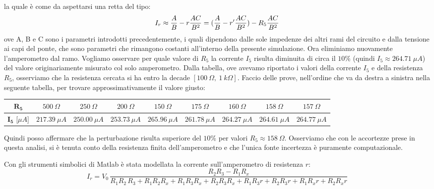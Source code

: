 la quale è come da aspettarsi una retta del tipo:
\begin{equation}
    I_r \approx {A\over{B}} - r {{A C}\over{B^2}} = ({A\over{B}} - r' {{A C}\over{B^2}}) - R_5 {{A C}\over{B^2}}  
\end{equation}
ove A, B e C sono i parametri introdotti precedentemente, i quali dipendono dalle sole impedenze dei altri rami del circuito e dalla tensione ai capi del ponte, che sono parametri che rimangono costanti all'interno della presente simulazione.
Ora eliminiamo nuovamente l'amperometro dal ramo. Vogliamo osservare per quale valore di $R_5$ la corrente $I_5$ risulta diminuita di circa il $10 \%$ (quindi $I_5 \approx 264.71 \: \mu A$) del valore originariamente misurato col solo amperometro. Dalla tabella, ove avevamo riportato i valori della corrente $I_5$ e della resistenza $R_5$, osserviamo che la resistenza cercata si ha entro la decade $[100 \: \Omega, \: 1 \: k\Omega]$.
Faccio delle prove, nell'ordine che va da destra a sinistra nella seguente tabella, per trovare approssimativamente il valore giusto:
\begin{center}
\begin{tabular}{|c|c|c|c|c|c|c|c|c|}
\hline
$\textbf{R}_{\textbf{5}}$        &$500 \: \Omega$        &$250 \: \Omega$        &$200 \: \Omega$        &$150 \: \Omega$        &$175 \: \Omega$        &$160 \: \Omega$        &$158 \: \Omega$        &$157 \: \Omega$        \\
\hline
$\textbf{I}_{\textbf{5}}$ [$\mu A$]         &$217.39 \: \mu A$        &$250.00 \: \mu A$        &$253.73 \: \mu A$        &$265.96 \: \mu A$        &$261.78 \: \mu A$        &$264.27 \: \mu A$        &$264.61 \: \mu A$        &$264.77 \: \mu A$        \\
\hline
\end{tabular}
\end{center}
Quindi posso affermare che la perturbazione risulta superiore del $10\%$ per valori $R_5 \approx 158 \: \Omega$.
Osserviamo che con le accortezze prese in questa analisi, si è tenuta conto della resistenza finita dell'amperometro e che l'unica fonte incertezza è puramente computazionale.

Con gli strumenti simbolici di Matlab è stata modellata la corrente sull'amperometro di resistenza $r$:
\begin{equation*}
    I_r = V_{0}\,\frac{R_{2}R_{3}-R_{1}R_{x}}{R_{1}R_{2}\,R_{3}+R_{1}R_{2}R_{x}+R_{1}R_{3}R_{x}+R_{2}R_{3}R_{x}+R_{1}R_{3}r+R_{2}R_{3}r+R_{1}R_{x}r+R_{2}R_{x}r}
\end{equation*}

